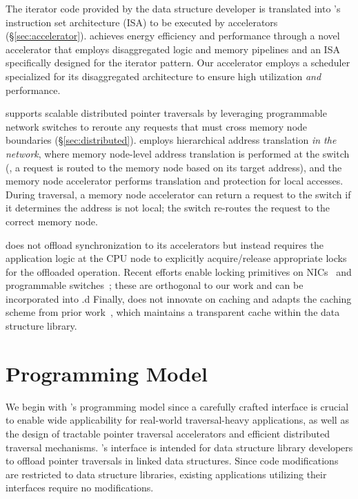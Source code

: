 The iterator code provided by the data structure developer is translated into \pulse's instruction set architecture (ISA) to be executed by \pulse accelerators (\S\ref{sec:accelerator}). \pulse achieves energy efficiency and performance through a novel accelerator that employs disaggregated logic and memory pipelines and an ISA specifically designed for the iterator pattern. Our accelerator employs a scheduler specialized for its disaggregated architecture to ensure high utilization \emph{and} performance. 


\pulse supports scalable distributed pointer traversals by leveraging programmable network switches to reroute any requests that must cross memory node boundaries (\S\ref{sec:distributed}). \pulse employs hierarchical address translation \emph{in the network}, where memory node-level address translation is performed at the switch (\ie, a request is routed to the memory node based on its target address), and the memory node accelerator performs translation and protection for local accesses. During traversal, a memory node accelerator can return a request to the switch if it determines the address is not local; the switch re-routes the request to the correct memory node.


 \pulse does not offload synchronization to its accelerators but instead requires the application logic at the CPU node to explicitly acquire/release appropriate locks for the offloaded operation. Recent efforts enable locking primitives on NICs~\cite{sherman, clover} and programmable switches~\cite{netlock}; these are orthogonal to our work and can be incorporated into \pulse.d
Finally, \pulse does not innovate on caching and adapts the caching scheme from prior work~\cite{aifm}, which maintains a transparent cache within the data structure library. 


\section{\pulse Programming Model}
\label{sec:interface}
We begin with \pulse's programming model since a carefully crafted interface is crucial to enable wide applicability for real-world traversal-heavy applications, as well as the design of tractable pointer traversal accelerators and efficient distributed traversal mechanisms. \pulse's interface is intended for data structure library developers to offload pointer traversals in linked data structures. Since \pulse code modifications are restricted to data structure libraries, existing applications utilizing their interfaces require no modifications. 

